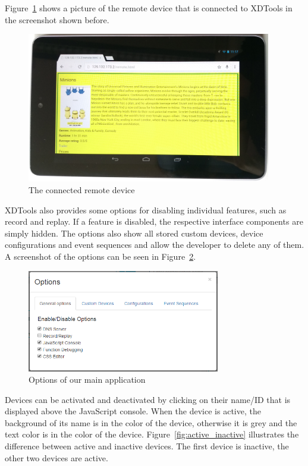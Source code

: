 Figure~\ref{fig:complete_remote} shows a picture of the remote device that is connected to XDTools in the screenshot shown before.

\begin{figure}[H]
  \centering
    \includegraphics[width=0.95\textwidth]{images/screenshots/remote_device.jpg}
	\caption[Screenshot: Remote Device]{The connected remote device}
	\label{fig:complete_remote}
\end{figure}

XDTools also provides some options for disabling individual features, such as record and replay. If a feature is disabled, the respective interface components are simply hidden. The options also show all stored custom devices, device configurations and event sequences and allow the developer to delete any of them. A screenshot of the options can be seen in Figure~\ref{fig:options}.

\begin{figure}[H]
  \centering
    \includegraphics[width=0.75\textwidth]{images/screenshots/options.png}
	\caption[Screenshot: Options]{Options of our main application}
	\label{fig:options}
\end{figure}

Devices can be activated and deactivated by clicking on their name/ID that is displayed above the JavaScript console. When the device is active, the background of its name is in the color of the device, otherwise it is grey and the text color is in the color of the device. Figure~\ref{fig:active_inactive} illustrates the difference between active and inactive devices. The first device is inactive, the other two devices are active.

